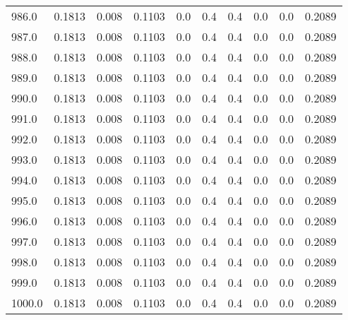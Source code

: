 \begin{longtable}{lrrrrrrrrr}
986.0 & 0.1813 & 0.008 & 0.1103 & 0.0 & 0.4 & 0.4 & 0.0 & 0.0 & 0.2089 \\
987.0 & 0.1813 & 0.008 & 0.1103 & 0.0 & 0.4 & 0.4 & 0.0 & 0.0 & 0.2089 \\
988.0 & 0.1813 & 0.008 & 0.1103 & 0.0 & 0.4 & 0.4 & 0.0 & 0.0 & 0.2089 \\
989.0 & 0.1813 & 0.008 & 0.1103 & 0.0 & 0.4 & 0.4 & 0.0 & 0.0 & 0.2089 \\
990.0 & 0.1813 & 0.008 & 0.1103 & 0.0 & 0.4 & 0.4 & 0.0 & 0.0 & 0.2089 \\
991.0 & 0.1813 & 0.008 & 0.1103 & 0.0 & 0.4 & 0.4 & 0.0 & 0.0 & 0.2089 \\
992.0 & 0.1813 & 0.008 & 0.1103 & 0.0 & 0.4 & 0.4 & 0.0 & 0.0 & 0.2089 \\
993.0 & 0.1813 & 0.008 & 0.1103 & 0.0 & 0.4 & 0.4 & 0.0 & 0.0 & 0.2089 \\
994.0 & 0.1813 & 0.008 & 0.1103 & 0.0 & 0.4 & 0.4 & 0.0 & 0.0 & 0.2089 \\
995.0 & 0.1813 & 0.008 & 0.1103 & 0.0 & 0.4 & 0.4 & 0.0 & 0.0 & 0.2089 \\
996.0 & 0.1813 & 0.008 & 0.1103 & 0.0 & 0.4 & 0.4 & 0.0 & 0.0 & 0.2089 \\
997.0 & 0.1813 & 0.008 & 0.1103 & 0.0 & 0.4 & 0.4 & 0.0 & 0.0 & 0.2089 \\
998.0 & 0.1813 & 0.008 & 0.1103 & 0.0 & 0.4 & 0.4 & 0.0 & 0.0 & 0.2089 \\
999.0 & 0.1813 & 0.008 & 0.1103 & 0.0 & 0.4 & 0.4 & 0.0 & 0.0 & 0.2089 \\
1000.0 & 0.1813 & 0.008 & 0.1103 & 0.0 & 0.4 & 0.4 & 0.0 & 0.0 & 0.2089 \\
\end{longtable}